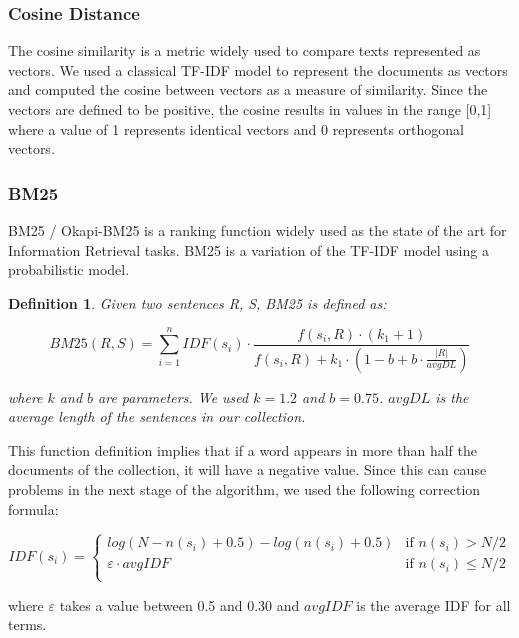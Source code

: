 \documentclass{llncs}
\newtheorem{definicion}{Definition}
\begin{document}
\subsubsection{Cosine Distance}
The cosine similarity is a metric widely used to compare texts represented as vectors. We used a classical TF-IDF model to represent the documents as vectors and computed the cosine between vectors as a measure of similarity. Since the vectors are defined to be positive, the cosine results in values in the range [0,1] where a value of 1 represents identical vectors and 0 represents orthogonal vectors.

\subsubsection{BM25}
BM25 / Okapi-BM25 is a ranking function widely used as the state of the art for Information Retrieval tasks. BM25 is a variation of the TF-IDF model using a probabilistic model.

\begin{definicion}
Given two sentences R, S, BM25 is defined as:

\begin{equation}
BM25(R,S) = \sum_{i=1}^{n} IDF(s_i) \cdot \frac{f(s_i, R) \cdot (k_1 + 1)}{f(s_i, R) + k_1 \cdot (1 - b + b \cdot \frac{|R|}{avgDL})}
\end{equation}

where $k$ and $b$ are parameters. We used $k = 1.2$ and $b = 0.75$. $avgDL$ is the average length of the sentences in our collection.
\end{definicion}

This function definition implies that if a word appears in more than half the documents of the collection, it will have a negative value. Since this can cause problems in the next stage of the algorithm, we used the following correction formula:
                
\begin{equation}
 IDF(s_i) =
  \begin{cases}
       log(N - n(s_i) + 0.5) - log(n(s_i) + 0.5)    & \text{if }  n(s_i) > N/2\\
       \varepsilon \cdot avgIDF                     & \text{if }  n(s_i) \leq N/2\\
  \end{cases}
\end{equation}                
                
where $\varepsilon$ takes a value between 0.5 and 0.30 and $avgIDF$ is the average IDF for all terms.
\end{document}
